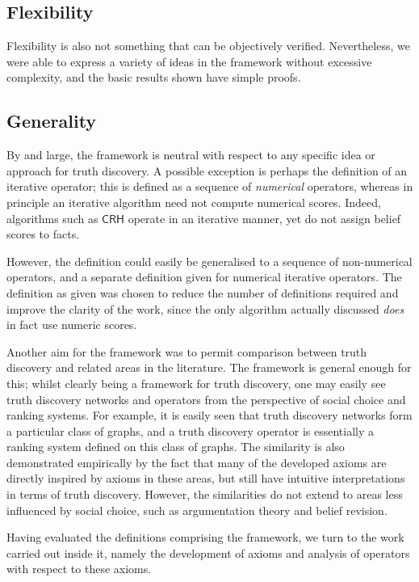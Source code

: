 \documentclass[../main.tex]{subfiles}
\begin{document}
\subsection*{Flexibility}

Flexibility is also not something that can be objectively verified.
Nevertheless, we were able to express a variety of ideas in the framework
without excessive complexity, and the basic results shown have simple proofs.

\subsection*{Generality}

By and large, the framework is neutral with respect to any specific idea or
approach for truth discovery. A possible exception is perhaps the definition of
an iterative operator; this is defined as a sequence of \emph{numerical}
operators, whereas in principle an iterative algorithm need not compute
numerical scores. Indeed, algorithms such as $\mathsf{CRH}$ \cite{li_conflicts}
operate in an iterative manner, yet do not assign belief scores to facts.

However, the definition could easily be generalised to a sequence of
non-numerical operators, and a separate definition given for numerical
iterative operators. The definition as given was chosen to reduce the number of
definitions required and improve the clarity of the work, since the only
algorithm actually discussed \emph{does} in fact use numeric scores.

Another aim for the framework was to permit comparison between truth discovery
and related areas in the literature. The framework is general enough for this;
whilst clearly being a framework for truth discovery, one may easily see truth
discovery networks and operators from the perspective of social choice and
ranking systems. For example, it is easily seen that truth discovery networks
form a particular class of graphs, and a truth discovery operator is
essentially a ranking system defined on this class of graphs. The similarity is
also demonstrated empirically by the fact that many of the developed axioms are
directly inspired by axioms in these areas, but still have intuitive
interpretations in terms of truth discovery. However, the similarities do not
extend to areas less influenced by social choice, such as argumentation theory
and belief revision.

Having evaluated the definitions comprising the framework, we turn to the work
carried out inside it, namely the development of axioms and analysis of
operators with respect to these axioms.
\end{document}
